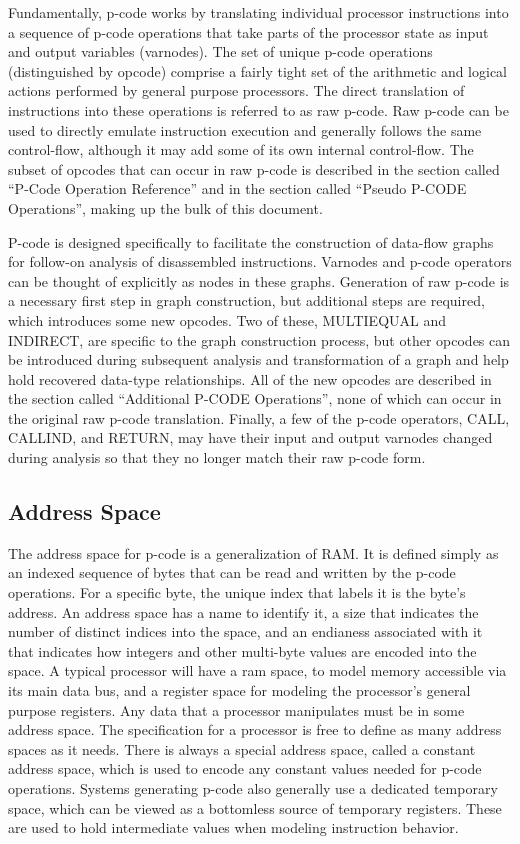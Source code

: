 Fundamentally, p-code works by translating individual processor instructions into a sequence of p-code operations that take parts of the processor state as input and output variables (varnodes). The set of unique p-code operations (distinguished by opcode) comprise a fairly tight set of the arithmetic and logical actions performed by general purpose processors. The direct translation of instructions into these operations is referred to as raw p-code. Raw p-code can be used to directly emulate instruction execution and generally follows the same control-flow, although it may add some of its own internal control-flow. The subset of opcodes that can occur in raw p-code is described in the section called “P-Code Operation Reference” and in the section called “Pseudo P-CODE Operations”, making up the bulk of this document.

P-code is designed specifically to facilitate the construction of data-flow graphs for follow-on analysis of disassembled instructions. Varnodes and p-code operators can be thought of explicitly as nodes in these graphs. Generation of raw p-code is a necessary first step in graph construction, but additional steps are required, which introduces some new opcodes. Two of these, MULTIEQUAL and INDIRECT, are specific to the graph construction process, but other opcodes can be introduced during subsequent analysis and transformation of a graph and help hold recovered data-type relationships. All of the new opcodes are described in the section called “Additional P-CODE Operations”, none of which can occur in the original raw p-code translation. Finally, a few of the p-code operators, CALL, CALLIND, and RETURN, may have their input and output varnodes changed during analysis so that they no longer match their raw p-code form.
\subsection{Address Space}
The address space for p-code is a generalization of RAM. It is defined simply as an indexed sequence of bytes that can be read and written by the p-code operations. For a specific byte, the unique index that labels it is the byte's address. An address space has a name to identify it, a size that indicates the number of distinct indices into the space, and an endianess associated with it that indicates how integers and other multi-byte values are encoded into the space. A typical processor will have a ram space, to model memory accessible via its main data bus, and a register space for modeling the processor's general purpose registers. Any data that a processor manipulates must be in some address space. The specification for a processor is free to define as many address spaces as it needs. There is always a special address space, called a constant address space, which is used to encode any constant values needed for p-code operations. Systems generating p-code also generally use a dedicated temporary space, which can be viewed as a bottomless source of temporary registers. These are used to hold intermediate values when modeling instruction behavior.

